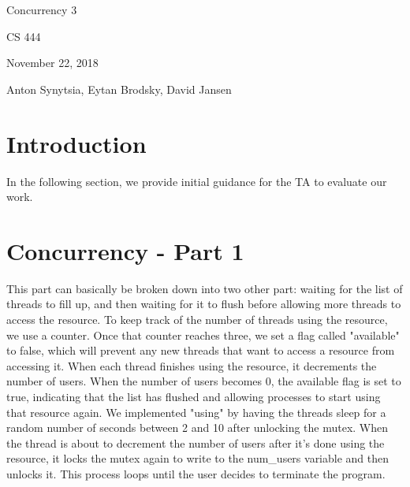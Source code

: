 \documentclass[onecolumn, oneside, letterpaper, draftclsnofoot, 10pt, compsoc]{IEEEtran}
\begin{document}
\begin{titlepage}
\begin{singlespace}
\centering
\scshape{
    \huge{Concurrency 3}\par
    \vspace{.5in}
    \large{CS 444}\par
    \large{November 22, 2018}\par
    \vspace{.5in}
    \large{Anton Synytsia, Eytan Brodsky, David Jansen}\par
    \vspace{.5in}
    \vfill
}
\end{singlespace}
\end{titlepage}
\newpage
{}
\tableofcontents
\clearpage

\section{Introduction}
In the following section, we provide initial guidance for the TA to evaluate our work.

\section{Concurrency - Part 1}

This part can basically be broken down into two other part: waiting for the list of threads to fill up, and then waiting for it to flush before allowing more threads to access the resource. To keep track of the number of threads using the resource, we use a counter. Once that counter reaches three, we set a flag called "available" to false, which will prevent any new threads that want to access a resource from accessing it. When each thread finishes using the resource, it decrements the number of users. When the number of users becomes 0, the available flag is set to true, indicating that the list has flushed and allowing processes to start using that resource again. We implemented "using" by having the threads sleep for a random number of seconds between 2 and 10 after unlocking the mutex. When the thread is about to decrement the number of users after it's done using the resource, it locks the mutex again to write to the num\_users variable and then unlocks it. This process loops until the user decides to terminate the program.
\end{document}
